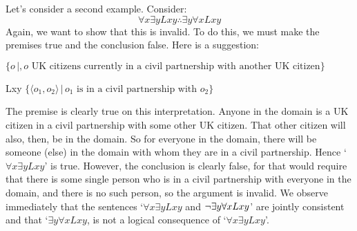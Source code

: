 Let's consider a second example. Consider:
	$$\forall x \exists y Lxy \therefore \exists y \forall x Lxy$$
Again, we want to show that this is invalid. To do this, we must make the premises true and the conclusion false. Here is a suggestion:
	\begin{ekey}
		\item[\text{domain}] $\{o\,|,o\text{ UK citizens currently in a civil partnership with another UK citizen}\}$
		\item[Lxy] $\{\langle o_1,o_2\rangle\,|\, o_1\text{ is in a civil partnership with }o_2\}$
	\end{ekey}
The premise is clearly true on this interpretation. Anyone in the domain is a UK citizen in a civil partnership with some other UK citizen. That other citizen will also, then, be in the domain. So for everyone in the domain, there will be someone (else) in the domain with whom they are in a civil partnership. Hence `$\forall x \exists y Lxy$' is true. However, the conclusion is clearly false, for that would require that there is some single person who is in a civil partnership with everyone in the domain, and there is no such person, so the argument is invalid. We observe immediately that the sentences `$\forall x \exists y Lxy$ and $\neg\exists y \forall x Lxy$' are jointly consistent and that `$\exists y \forall x Lxy$, is not a logical consequence of `$\forall x \exists y Lxy$'.

